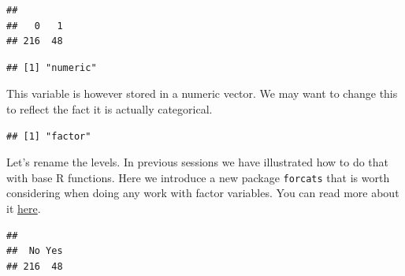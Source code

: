 \documentclass[
]{book}
\newenvironment{Shaded}{\begin{snugshade}}{\end{snugshade}}
\newcommand{\AttributeTok}[1]{\textcolor[rgb]{0.77,0.63,0.00}{#1}}
\newcommand{\FunctionTok}[1]{\textcolor[rgb]{0.00,0.00,0.00}{#1}}
\newcommand{\NormalTok}[1]{#1}
\newcommand{\OtherTok}[1]{\textcolor[rgb]{0.56,0.35,0.01}{#1}}
\newcommand{\SpecialCharTok}[1]{\textcolor[rgb]{0.00,0.00,0.00}{#1}}
\newcommand{\StringTok}[1]{\textcolor[rgb]{0.31,0.60,0.02}{#1}}
\begin{document}
\begin{verbatim}
## 
##   0   1 
## 216  48
\end{verbatim}

\begin{Shaded}
\end{Shaded}

\begin{verbatim}
## [1] "numeric"
\end{verbatim}

This variable is however stored in a numeric vector. We may want to change this to reflect the fact it is actually categorical.

\begin{Shaded}
\end{Shaded}

\begin{verbatim}
## [1] "factor"
\end{verbatim}

Let's rename the levels. In previous sessions we have illustrated how to do that with base R functions. Here we introduce a new package \texttt{forcats} that is worth considering when doing any work with factor variables. You can read more about it \href{https://forcats.tidyverse.org}{here}.

\begin{Shaded}
\end{Shaded}

\begin{verbatim}
## 
##  No Yes 
## 216  48
\end{verbatim}
\end{document}

